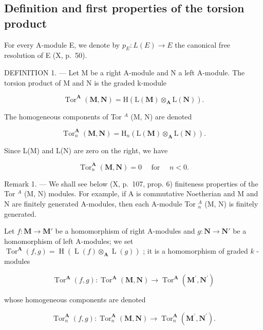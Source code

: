 \subsection{Definition and first properties of the torsion product}

For every A-module E, we denote by \(p_{E}: L(E) \to E\) the canonical free resolution of E (X, p.~50).

DEFINITION 1. --- Let M be a right A-module and N a left A-module. The torsion product of M and N is the graded k-module

\[
\operatorname{Tor} ^ {\mathbf {A}} (\mathbf {M}, \mathbf {N}) = \mathrm{H} (\mathrm{L} (\mathbf {M}) \otimes_ {\mathbf {A}} \mathrm{L} (\mathbf {N}))  .\tag{4}
\]

The homogeneous components of Tor \(^{A}\) (M, N) are denoted

\[
\operatorname{Tor} _ {n} ^ {\mathbf {A}} (\mathbf {M}, \mathbf {N}) = \mathrm{H} _ {n} (\mathrm{L} (\mathbf {M}) \otimes_ {\mathbf {A}} \mathrm{L} (\mathbf {N})).\tag{5}
\]

Since L(M) and L(N) are zero on the right, we have

\[
\operatorname{Tor} _ {n} ^ {\mathbf {A}} (\mathbf {M}, \mathbf {N}) = 0 \quad \text { for } \quad n <   0.\tag{6}
\]

Remark 1. --- We shall see below (X, p.~107, prop. 6) finiteness properties of the Tor \(^{A}\) (M, N) modules. For example, if A is commutative Noetherian and M and N are finitely generated A-modules, then each A-module Tor \(_{n}^{A}\) (M, N) is finitely generated.

Let \(f: \mathbf{M} \to \mathbf{M}'\) be a homomorphism of right A-modules and \(g: \mathbf{N} \to \mathbf{N}'\) be a homomorphism of left A-modules; we set \(\operatorname{Tor}^{\mathbf{A}}(f, g) = \operatorname{H}\left(\operatorname{L}(f) \otimes_{\mathbf{A}} \operatorname{L}(g)\right)\) ; it is a homomorphism of graded \(k\) -modules

\[
\operatorname{Tor} ^ {\mathbf {A}} (f, g): \operatorname{Tor} ^ {\mathbf {A}} (\mathbf {M}, \mathbf {N}) \rightarrow \operatorname{Tor} ^ {\mathbf {A}} (\mathbf {M} ^ {\prime}, \mathbf {N} ^ {\prime})
\]

whose homogeneous components are denoted

\[
\operatorname{Tor} _ {n} ^ {\mathbf {A}} (f, g): \operatorname{Tor} _ {n} ^ {\mathbf {A}} (\mathbf {M}, \mathbf {N}) \rightarrow \operatorname{Tor} _ {n} ^ {\mathbf {A}} (\mathbf {M} ^ {\prime}, \mathbf {N} ^ {\prime}).
\]

